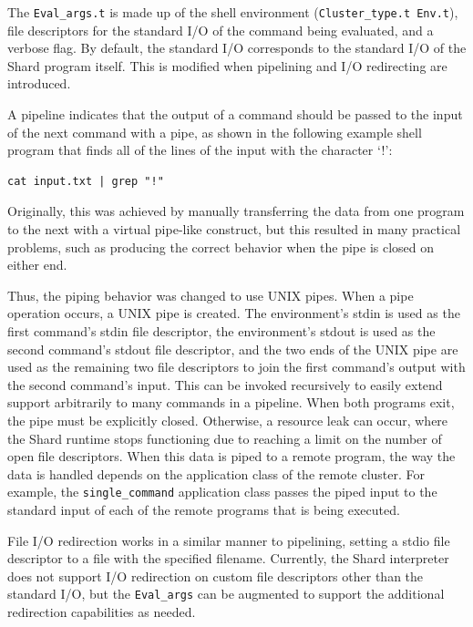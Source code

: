 \documentclass[oneside]{report}
\begin{document}
The \texttt{Eval\_args.t} is made up of the shell environment (\texttt{Cluster\_type.t Env.t}), file descriptors for the standard I/O of the command being evaluated, and a verbose flag.
By default, the standard I/O corresponds to the standard I/O of the Shard program itself.
This is modified when pipelining and I/O redirecting are introduced.

A pipeline indicates that the output of a command should be passed to the input of the next command with a pipe, as shown in the following example shell program that finds all of the lines of the input with the character `!':

\begin{minipage}[c]{\textwidth-15pt}
  \begin{lstlisting}[language=shard]
cat input.txt | grep "!"
\end{lstlisting}
  \smallskip
\end{minipage}

Originally, this was achieved by manually transferring the data from one program to the next with a virtual pipe-like construct, but this resulted in many practical problems, such as producing the correct behavior when the pipe is closed on either end.

Thus, the piping behavior was changed to use UNIX pipes.
When a pipe operation occurs, a UNIX pipe is created.
The environment's stdin is used as the first command's stdin file descriptor, the environment's stdout is used as the second command's stdout file descriptor, and the two ends of the UNIX pipe are used as the remaining two file descriptors to join the first command's output with the second command's input.
This can be invoked recursively to easily extend support arbitrarily to many commands in a pipeline.
When both programs exit, the pipe must be explicitly closed.
Otherwise, a resource leak can occur, where the Shard runtime stops functioning due to reaching a limit on the number of open file descriptors.
When this data is piped to a remote program, the way the data is handled depends on the application class of the remote cluster.
For example, the \texttt{single\_command} application class passes the piped input to the standard input of each of the remote programs that is being executed.

File I/O redirection works in a similar manner to pipelining, setting a stdio file descriptor to a file with the specified filename.
Currently, the Shard interpreter does not support I/O redirection on custom file descriptors other than the standard I/O, but the \texttt{Eval\_args} can be augmented to support the additional redirection capabilities as needed.
\end{document}
